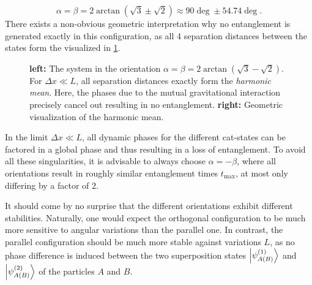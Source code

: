 \begin{equation}
  \alpha=\beta=2 \arctan(\sqrt{3}\pm\sqrt{2})\approx 90\deg \pm 54.74\deg .
\end{equation}
There exists a non-obvious geometric interpretation why no entanglement is generated exactly in this configuration, as all 4 separation distances between the states form the  visualized in \cref{fig:4:harmonic-mean}.
\begin{figure}[!htbp]
  \centering
  \def\svgwidth{\textwidth}
  
  \caption{\textbf{left:} The system in the orientation $\alpha=\beta=2\arctan(\sqrt{3}-\sqrt{2})$. For $\Delta x \ll L$, all separation distances exactly form the \textit{harmonic mean}. Here, the phases due to the mutual gravitational interaction precisely cancel out resulting in no entanglement. \textbf{right:} Geometric visualization of the harmonic mean.}
  \label{fig:4:harmonic-mean}
\end{figure}
In the limit $\Delta x \ll L$, all dynamic phases for the different cat-states can be factored in a global phase and thus resulting in a loss of entanglement. 
To avoid all these singularities, it is advisable to always choose $\alpha=-\beta$, where all orientations result in roughly similar entanglement times $t_\mathrm{max}$, at most only differing by a factor of $2$.

It should come by no surprise that the different orientations exhibit different stabilities. Naturally, one would expect the orthogonal configuration to be much more sensitive to angular variations than the parallel one.
In contrast, the parallel configuration should be much more stable against variations $L$, as no phase difference is induced between the two superposition states $\ket{\psi^{(1)}_{A(B)}}$ and $\ket{\psi^{(2)}_{A(B)}}$ of the particles $A$ and $B$.

